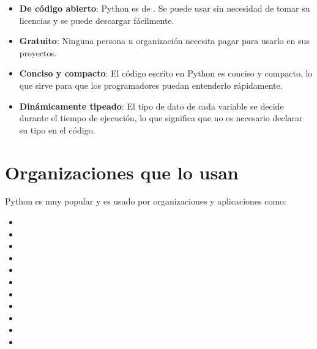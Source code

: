 \begin{itemize}
  \item \textbf{De código abierto}: Python es de . Se puede usar sin necesidad de tomar su licencias y se puede descargar fácilmente.
  
  \item \textbf{Gratuito}: Ninguna persona u organización necesita pagar para usarlo en sus proyectos.
  
  \item \textbf{Conciso y compacto}: El código escrito en Python es conciso y compacto, lo que sirve para que los programadores puedan entenderlo rápidamente.
  
  \item \textbf{Dinámicamente tipeado}: El tipo de dato de cada variable se decide durante el tiempo de ejecución, lo que significa que no es necesario declarar su tipo en el código.
  
\end{itemize}

\section{Organizaciones que lo usan}

Python es muy popular y es usado por organizaciones y aplicaciones como:

\begin{itemize}
  \item {}

  \item {}
  
  \item {}
  
  \item {}
  
  \item {}
  
  \item {}
  
  \item {}
  
  \item {}

  \item {}
  
  \item {}
  
  \item {}
  
\end{itemize}

